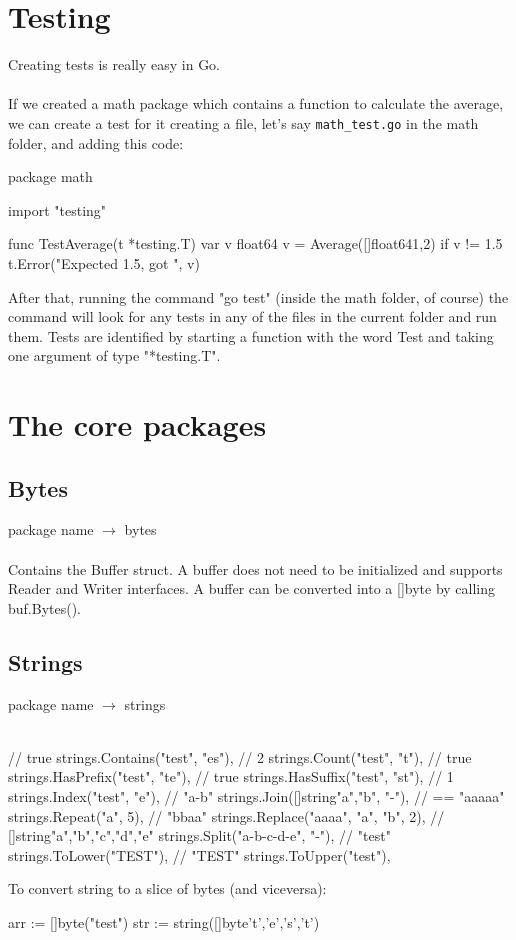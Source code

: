 \documentclass[twoside,a4paper,english]{report}
\begin{document}
\chapter{Testing}
Creating tests is really easy in Go.\\\\
If we created a math package which contains a function to calculate the average, we can create a test for it creating a file, let's say \verb|math_test.go| in the math folder, and adding this code:
\begin{go}
package math

import "testing"

func TestAverage(t *testing.T) {
    var v float64
    v = Average([]float64{1,2})
    if v != 1.5 {
           t.Error("Expected 1.5, got ", v)
    }
}
\end{go}
\vspace{0.7cm}
After that, running the command "go test" (inside the math folder, of course) the command will look for any tests in any of the files in the current folder and run them. Tests are identified by starting a function with the word Test and taking one argument of type "*testing.T".

\chapter{The core packages}
\section{Bytes}
package name $\rightarrow$ bytes\\\\
Contains the Buffer struct. A buffer does not need to be initialized and supports Reader and Writer interfaces. A buffer can be converted into a []byte by calling buf.Bytes().
\section{Strings}
package name $\rightarrow$ strings\\\\
\begin{go}
// true
strings.Contains("test", "es"),
// 2
strings.Count("test", "t"),
// true
strings.HasPrefix("test", "te"),
// true
strings.HasSuffix("test", "st"),
// 1
strings.Index("test", "e"),
// "a-b"
strings.Join([]string{"a","b"}, "-"),
// == "aaaaa"
strings.Repeat("a", 5),
// "bbaa"
strings.Replace("aaaa", "a", "b", 2),
// []string{"a","b","c","d","e"}
strings.Split("a-b-c-d-e", "-"),
// "test"
strings.ToLower("TEST"),
// "TEST"
strings.ToUpper("test"),

\end{go}
\vspace{0.7cm}
To convert string to a slice of bytes (and viceversa):
\begin{go}
arr := []byte("test")
str := string([]byte{'t','e','s','t'})
\end{go}
\end{document}
